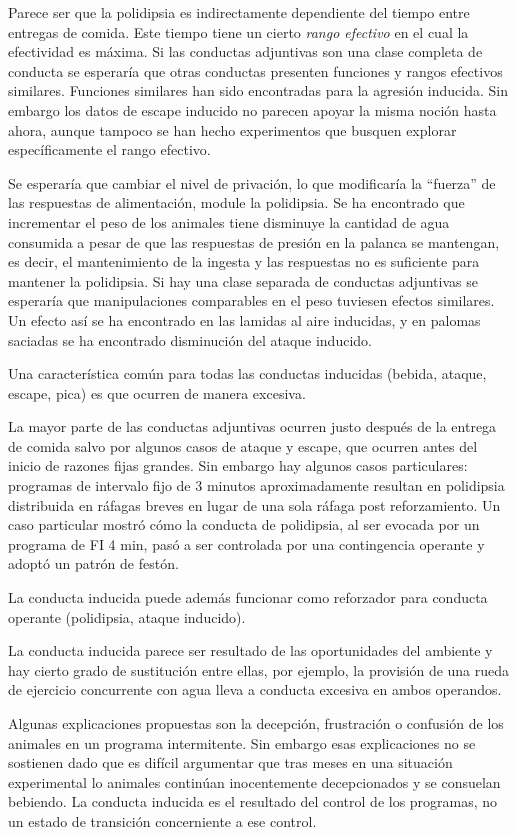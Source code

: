 \documentclass[a4paper,12pt]{article}
\begin{document}
Parece ser que la polidipsia es indirectamente dependiente del tiempo entre entregas de comida. Este tiempo tiene un cierto {\itshape rango efectivo} en el cual la efectividad es máxima. Si las conductas adjuntivas son una clase completa de conducta se esperaría que otras conductas presenten funciones y rangos efectivos similares. Funciones similares han sido encontradas para la agresión inducida. Sin embargo los datos de escape inducido no parecen apoyar la misma noción hasta ahora, aunque tampoco se han hecho experimentos que busquen explorar específicamente el rango efectivo.

Se esperaría que cambiar el nivel de privación, lo que modificaría la ``fuerza'' de las respuestas de alimentación, module la polidipsia. Se ha encontrado que incrementar el peso de los animales tiene disminuye la cantidad de agua consumida a pesar de que las respuestas de presión en la palanca se mantengan, es decir, el mantenimiento de la ingesta y las respuestas no es suficiente para mantener la polidipsia. Si hay una clase separada de conductas adjuntivas se esperaría que manipulaciones comparables en el peso tuviesen efectos similares. Un efecto así se ha encontrado en las lamidas al aire inducidas, y en palomas saciadas se ha encontrado disminución del ataque inducido.

Una característica común para todas las conductas inducidas (bebida, ataque, escape, pica) es que ocurren de manera excesiva.

La mayor parte de las conductas adjuntivas ocurren justo después de la entrega de comida salvo por algunos casos de ataque y escape, que ocurren antes del inicio de razones fijas grandes. Sin embargo hay algunos casos particulares: programas de intervalo fijo de 3 minutos aproximadamente resultan en polidipsia distribuida en ráfagas breves en lugar de una sola ráfaga post reforzamiento. Un caso particular mostró cómo la conducta de polidipsia, al ser evocada por un programa de FI 4 min, pasó a ser controlada por una contingencia operante y adoptó un patrón de festón.

La conducta inducida puede además funcionar como reforzador para conducta operante (polidipsia, ataque inducido).

La conducta inducida parece ser resultado de las oportunidades del ambiente y hay cierto grado de sustitución entre ellas, por ejemplo, la provisión de una rueda de ejercicio concurrente con agua lleva a conducta excesiva en ambos operandos.

Algunas explicaciones propuestas son la decepción, frustración o confusión de los animales en un programa intermitente. Sin embargo esas explicaciones no se sostienen dado que es difícil argumentar que tras meses en una situación experimental lo animales continúan inocentemente decepcionados y se consuelan bebiendo. La conducta inducida es el resultado del control de los programas, no un estado de transición concerniente a ese control.
\end{document}
